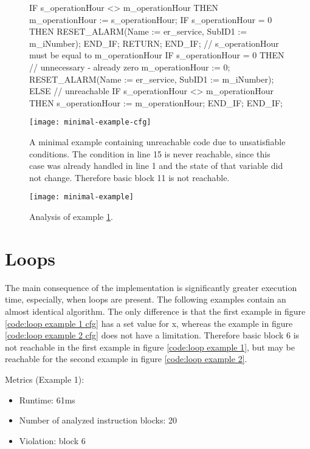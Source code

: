 \begin{figure}
	\begin{GenericCode}
IF s_operationHour <> m_operationHour THEN
	m_operationHour := s_operationHour;
	IF s_operationHour = 0 THEN
		RESET_ALARM(Name := er_service, SubID1 := m_iNumber);
	END_IF;
	RETURN;
END_IF;
// s_operationHour must be equal to m_operationHour
IF s_operationHour = 0 THEN
	// unnecessary - already zero
	m_operationHour := 0;
	RESET_ALARM(Name := er_service, SubID1 := m_iNumber);
ELSE
	// unreachable
	IF s_operationHour <> m_operationHour THEN
		s_operationHour := m_operationHour;
	END_IF;
END_IF;	\end{GenericCode}
	\centering

	\texttt{[image: minimal-example-cfg]}
	\caption{A minimal example containing unreachable code due to unsatisfiable conditions. The condition in line 15 is never reachable, since this case was already handled in line 1 and the state of that variable did not change. Therefore basic block 11 is not reachable.}
	\label{code:basic example 1 cfg}
\end{figure}

\begin{figure}
	\centering
	\texttt{[image: minimal-example]}
	\caption{Analysis of example \ref{code:basic example 1 cfg}. }
	\label{code:basic example 1}
\end{figure}

\section{Loops}
The main consequence of the implementation is significantly greater execution time, especially, when loops are present.
The following examples contain an almost identical algorithm. The only difference is that the first example in figure \ref{code:loop example 1 cfg} has a set value for x, whereas the example in figure \ref{code:loop example 2 cfg} does not have a limitation. Therefore basic block 6 is not reachable in the first example in figure \ref{code:loop example 1}, but may be reachable for the second example in figure \ref{code:loop example 2}.


Metrics (Example 1):
\begin{itemize}
	\item Runtime: 61ms
	\item Number of analyzed instruction blocks: 20
	\item Violation: block 6
\end{itemize}



